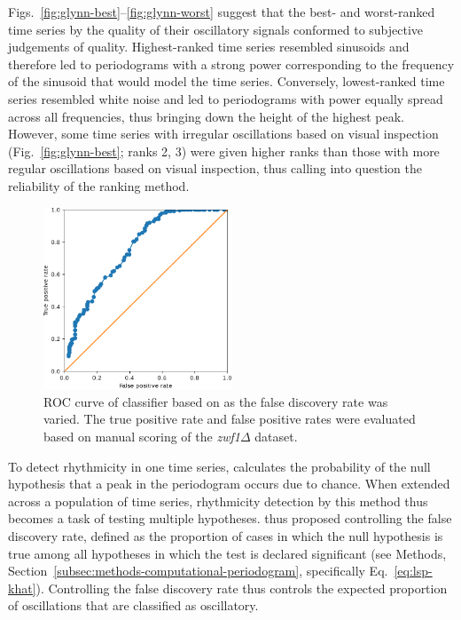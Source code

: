 Figs.\ \ref{fig:glynn-best}--\ref{fig:glynn-worst} suggest that the best- and worst-ranked time series by the quality of their oscillatory signals conformed to subjective judgements of quality.
Highest-ranked time series resembled sinusoids and therefore led to periodograms with a strong power corresponding to the frequency of the sinusoid that would model the time series.
Conversely, lowest-ranked time series resembled white noise and led to periodograms with power equally spread across all frequencies, thus bringing down the height of the highest peak.
However, some time series with irregular oscillations based on visual inspection (Fig.\ \ref{fig:glynn-best}; ranks 2, 3) were given higher ranks than those with more regular oscillations based on visual inspection, thus calling into question the reliability of the ranking method.

\begin{figure}
  \centering
  \includegraphics[width=0.5\textwidth]{glynn_is20016_5_edit.pdf}
  \caption[
    ROC curve of classifier based on \textcite{glynnDetectingPeriodicPatterns2006a}.
  ]{
    ROC curve of classifier based on \textcite{glynnDetectingPeriodicPatterns2006a} as the false discovery rate was varied.
    The true positive rate and false positive rates were evaluated based on manual scoring of the \textit{zwf1$\Delta$} dataset.
  }
  \label{fig:glynn-roc}
\end{figure}

To detect rhythmicity in one time series, \textcite{glynnDetectingPeriodicPatterns2006a} calculates the probability of the null hypothesis that a peak in the periodogram occurs due to chance.
When extended across a population of time series, rhythmicity detection by this method thus becomes a task of testing multiple hypotheses.
\textcite{glynnDetectingPeriodicPatterns2006a} thus proposed controlling the false discovery rate, defined as the proportion of cases in which the null hypothesis is true among all hypotheses in which the test is declared significant (see Methods, Section~\ref{subsec:methods-computational-periodogram}, specifically Eq.\ \ref{eq:lsp-khat}).
Controlling the false discovery rate thus controls the expected proportion of oscillations that are classified as oscillatory.

